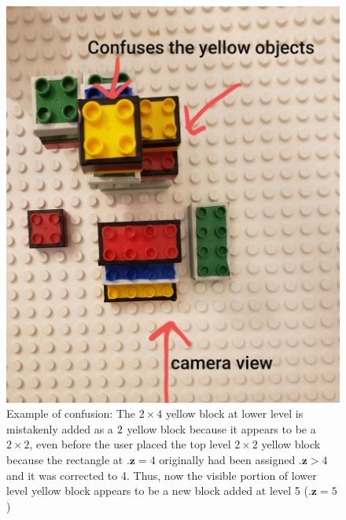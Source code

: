 \begin{figure}[h]
   \centering
   \includegraphics[scale=0.2]{figures/confusion.jpg}
   \caption[{Example of confusion}]{Example of confusion: The $2 \times 4$ yellow block at lower level is mistakenly added as a $2 \time 2$ yellow block because it appears to be a $2 \times 2$, even before the user placed the top level $2 \times 2$ yellow block because the rectangle at $\textbf{.z}=4$ originally had been assigned $\textbf{.z} > 4$ and it was corrected to 4. Thus, now the visible portion of lower level yellow block appears to be a new block added at level 5 ($\textbf{.z} = 5$)}
   \label{fig:fig_3-5}
\end{figure}
